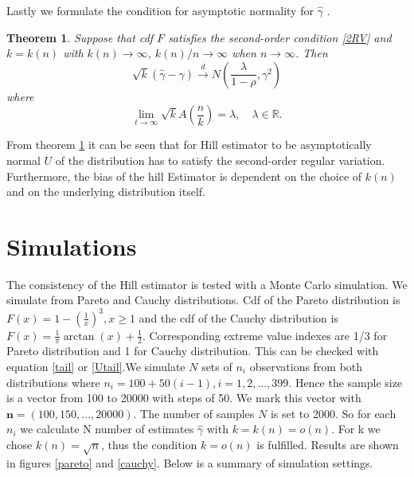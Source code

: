 \documentclass[english,12pt,a4paper,pdftex,sci,utf8]{aaltothesis} %
\newtheorem{theorem}{Theorem}[section]
\begin{document}
Lastly we formulate the condition for asymptotic normality for $\hat{\gamma}$ \cite{peng}.

\begin{theorem}
Suppose that cdf $F$ satisfies the second-order condition \ref{2RV} and $k=k(n)$ with $k(n)\rightarrow \infty$, $k(n)/n \rightarrow \infty$ when $n\rightarrow \infty$. Then
\begin{equation*}
\sqrt{k}(\hat{\gamma} - \gamma) \xrightarrow{d} N \left( \frac{\lambda}{1- \rho}, \gamma^2 \right)
\end{equation*}
where
\begin{equation*}
\lim_{t \rightarrow \infty} \sqrt{k}A \left(\frac{n}{k} \right) = \lambda, \quad \lambda \in \mathbb{R}.
\end{equation*}
\label{normality}
\end{theorem}
From theorem \ref{normality} it can be seen that for Hill estimator to be asymptotically normal $U$ of the distribution has to satisfy the second-order regular variation. Furthermore, the bias of the hill Estimator is dependent on the choice of $k(n)$ and on the underlying distribution itself.



\clearpage
\section{Simulations}
\label{simut}

The consistency of the Hill estimator is tested with a Monte Carlo simulation. We simulate from Pareto and Cauchy distributions. Cdf of the Pareto distribution is $F(x)=1-\left( \frac{1}{x} \right)^3, x \geq 1$ and the cdf of the Cauchy distribution is $F(x)=\frac{1}{\pi}\arctan(x) + \frac{1}{2}$. Corresponding extreme value indexes are 1/3 for Pareto distribution and 1 for Cauchy distribution. This can be checked with equation \ref{tail} or \ref{Utail}.We simulate $N$ sets of $n_i$ observations from both distributions where $n_i=100+50(i-1), i=1,2,...,399$. Hence the sample size is a vector from 100 to 20000 with steps of 50. We mark this vector with $\textbf{n}=(100,150,...,20000)$. The number of samples $N$ is set to 2000. So for each $n_i$ we calculate N number of estimates $\hat{\gamma}$ with $k=k(n)=o(n)$. For k we chose $k(n)=\sqrt{n}$, thus the condition $k=o(n)$ is fulfilled. Results are shown in figures \ref{pareto} and \ref{cauchy}. Below is a summary of simulation settings.

\end{document}
